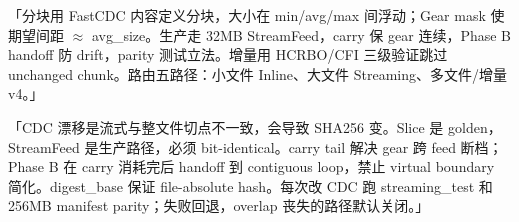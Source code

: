 \begin{corebox}[30 秒版]
「分块用 FastCDC 内容定义分块，大小在 min/avg/max 间浮动；Gear mask 使期望间距 $\approx$ avg\_size。生产走 32MB StreamFeed，carry 保 gear 连续，Phase B handoff 防 drift，parity 测试立法。增量用 HCRBO/CFI 三级验证跳过 unchanged chunk。路由五路径：小文件 Inline、大文件 Streaming、多文件/增量 v4。」
\end{corebox}

\begin{corebox}
「CDC 漂移是流式与整文件切点不一致，会导致 SHA256 变。Slice 是 golden，StreamFeed 是生产路径，必须 bit-identical。carry tail 解决 gear 跨 feed 断档；Phase B 在 carry 消耗完后 handoff 到 contiguous loop，禁止 virtual boundary 简化。digest\_base 保证 file-absolute hash。每次改 CDC 跑 streaming\_test 和 256MB manifest parity；失败回退，overlap 丧失的路径默认关闭。」
\end{corebox}
